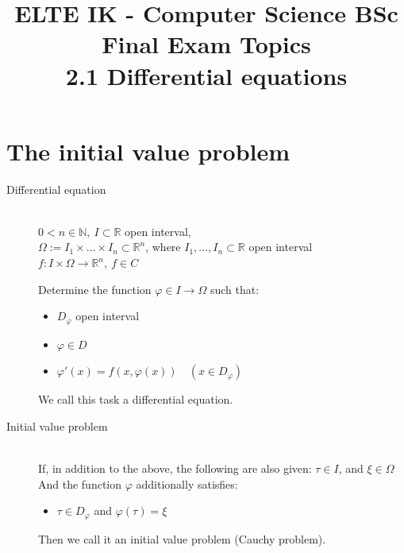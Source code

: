 \documentclass[margin=0px]{article}
\title{\textbf{{\Large ELTE IK - Computer Science BSc} \vspace{0.2cm} \\ {\huge Final Exam Topics}} \vspace{0.3cm} \\ 2.1 Differential equations}
\author{}
\date{}
\newcommand{\R}{\mathbb{R}}
\begin{document}
\maketitle

\begin{center}
\end{center}

\section{The initial value problem}
\begin{description}
    \item[Differential equation] \hfill \\
        $ 0 < n \in \mathbb{N}, \ I \subset \R$ open interval, \\
        $ \Omega := I_1 \times ... \times I_n \subset \R^n$, where $ I_1,...,I_n \subset \R$ open interval \\
        $f:I\times\Omega \rightarrow \R^n, \ f \in C $

        Determine the function $ \varphi \in I \rightarrow \Omega$ such that:
        \begin{itemize}
            \item $ D_{\varphi} $ open interval
            \item $ \varphi \in D $
            \item $ \varphi'(x) = f(x, \varphi(x)) \quad (x \in D_{\varphi}) $
        \end{itemize}

        We call this task a differential equation.
    \item[Initial value problem] \hfill \\
        If, in addition to the above, the following are also given: $ \tau \in I$, and $ \xi \in \Omega$ \\
        And the function $\varphi$ additionally satisfies:
        \begin{itemize}
            \item $\tau \in D_{\varphi}$ and $ \varphi(\tau) = \xi $
        \end{itemize}

        Then we call it an initial value problem (Cauchy problem).
\end{description}
\end{document}
